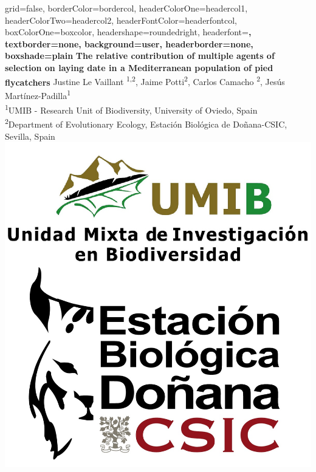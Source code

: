 \documentclass[a0paper,portrait]{baposter}
\newcommand{\up}[1]{\textsuperscript{#1}}     %
\begin{document}
\begin{poster}{
grid=false,
borderColor=bordercol, %
headerColorOne=headercol1, %
headerColorTwo=headercol2, %
headerFontColor=headerfontcol, %
boxColorOne=boxcolor, %
headershape=roundedright, %
headerfont=\Large\sf\bf, %
textborder=none,  %
background=user,
headerborder=none, %
boxshade=plain
}
{}
%
%
{\sf\bf\color{white}The relative contribution of multiple agents of selection on laying date in a Mediterranean population of pied flycatchers}
{\vspace{1em}\color{white} Justine Le Vaillant \up{1,2}, Jaime Potti\up{2}, Carlos Camacho \up{2}, Jes\'{u}s Mart\'{i}nez-Padilla\up{1} \\    %
{\smaller \up{1}UMIB - Research Unit of Biodiversity, University of Oviedo, Spain \\ \up{2}Department of Evolutionary Ecology, Estaci\'{o}n Biol\'{o}gica de Do\~{n}ana-CSIC, Sevilla, Spain }} %
{\includegraphics[scale=0.07]{logo_labo}} %


\end{poster}
\end{document}
